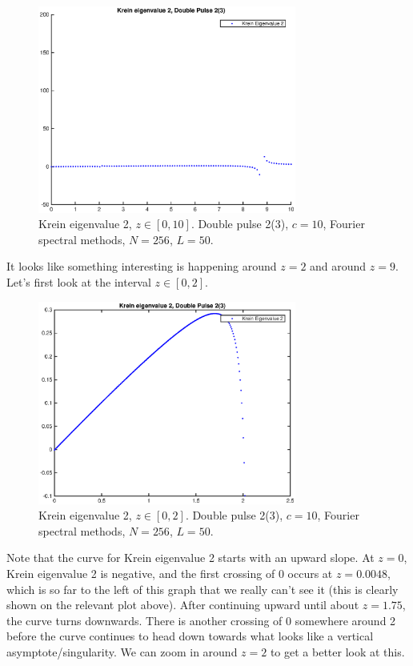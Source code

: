 \documentclass[12pt]{article}
\begin{document}
\begin{figure}[H]
	\includegraphics[width=8.5cm]{dp2kreineig4.eps}
	\caption{Krein eigenvalue 2, $z \in [0, 10]$. Double pulse 2(3), $c = 10$, Fourier spectral methods, $N =  256$, $L = 50$. }
\end{figure}

It looks like something interesting is happening around $z = 2$ and around $z = 9$. Let's first look at the interval $z \in [0, 2]$.

\begin{figure}[H]
	\includegraphics[width=8.5cm]{dp2kreineig0-2.eps}
	\caption{Krein eigenvalue 2, $z \in [0, 2]$. Double pulse 2(3), $c = 10$, Fourier spectral methods, $N =  256$, $L = 50$.}
\end{figure}

Note that the curve for Krein eigenvalue 2 starts with an upward slope. At $z = 0$, Krein eigenvalue 2 is negative, and the first crossing of 0 occurs at $z = 0.0048$, which is so far to the left of this graph that we really can't see it (this is clearly shown on the relevant plot above). After continuing upward until about $z = 1.75$, the curve turns downwards. There is another crossing of 0 somewhere around 2 before the curve continues to head down towards what looks like a vertical asymptote/singularity. We can zoom in around $z = 2$ to get a better look at this.
\end{document}
